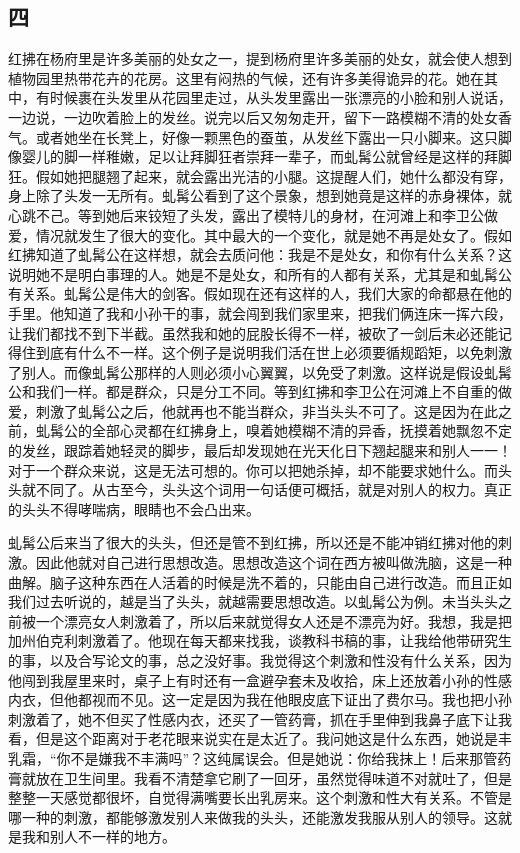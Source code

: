 \subsection{四} 

红拂在杨府里是许多美丽的处女之一，提到杨府里许多美丽的处女，就会使人想到植物园里热带花卉的花房。这里有闷热的气候，还有许多美得诡异的花。她在其中，有时候裹在头发里从花园里走过，从头发里露出一张漂亮的小脸和别人说话，一边说，一边吹着脸上的发丝。说完以后又匆匆走开，留下一路模糊不清的处女香气。或者她坐在长凳上，好像一颗黑色的蚕茧，从发丝下露出一只小脚来。这只脚像婴儿的脚一样稚嫩，足以让拜脚狂者崇拜一辈子，而虬髯公就曾经是这样的拜脚狂。假如她把腿翘了起来，就会露出光洁的小腿。这提醒人们，她什么都没有穿，身上除了头发一无所有。虬髯公看到了这个景象，想到她竟是这样的赤身裸体，就心跳不己。等到她后来铰短了头发，露出了模特儿的身材，在河滩上和李卫公做爱，情况就发生了很大的变化。其中最大的一个变化，就是她不再是处女了。假如红拂知道了虬髯公在这样想，就会去质问他：我是不是处女，和你有什么关系？这说明她不是明白事理的人。她是不是处女，和所有的人都有关系，尤其是和虬髯公有关系。虬髯公是伟大的剑客。假如现在还有这样的人，我们大家的命都悬在他的手里。他知道了我和小孙干的事，就会闯到我们家里来，把我们俩连床一挥六段，让我们都找不到下半截。虽然我和她的屁股长得不一样，被砍了一剑后未必还能记得住到底有什么不一样。这个例子是说明我们活在世上必须要循规蹈矩，以免刺激了别人。而像虬髯公那样的人则必须小心翼翼，以免受了刺激。这样说是假设虬髯公和我们一样。都是群众，只是分工不同。等到红拂和李卫公在河滩上不自重的做爱，刺激了虬髯公之后，他就再也不能当群众，非当头头不可了。这是因为在此之前，虬髯公的全部心灵都在红拂身上，嗅着她模糊不清的异香，抚摸着她飘忽不定的发丝，跟踪着她轻灵的脚步，最后却发现她在光天化日下翘起腿来和别人一一！对于一个群众来说，这是无法可想的。你可以把她杀掉，却不能要求她什么。而头头就不同了。从古至今，头头这个词用一句话便可概括，就是对别人的权力。真正的头头不得哮喘病，眼睛也不会凸出来。 

虬髯公后来当了很大的头头，但还是管不到红拂，所以还是不能冲销红拂对他的刺激。因此他就对自己进行思想改造。思想改造这个词在西方被叫做洗脑，这是一种曲解。脑子这种东西在人活着的时候是洗不着的，只能由自己进行改造。而且正如我们过去听说的，越是当了头头，就越需要思想改造。以虬髯公为例。未当头头之前被一个漂亮女人刺激着了，所以后来就觉得女人还是不漂亮为好。我想，我是把加州伯克利刺激着了。他现在每天都来找我，谈教科书稿的事，让我给他带研究生的事，以及合写论文的事，总之没好事。我觉得这个刺激和性没有什么关系，因为他闯到我屋里来时，桌子上有时还有一盒避孕套未及收拾，床上还放着小孙的性感内衣，但他都视而不见。这一定是因为我在他眼皮底下证出了费尔马。我也把小孙刺激着了，她不但买了性感内衣，还买了一管药膏，抓在手里伸到我鼻子底下让我看，但是这个距离对于老花眼来说实在是太近了。我问她这是什么东西，她说是丰乳霜，“你不是嫌我不丰满吗”？这纯属误会。但是她说：你给我抹上！后来那管药膏就放在卫生间里。我看不清楚拿它刷了一回牙，虽然觉得味道不对就吐了，但是整整一天感觉都很坏，自觉得满嘴要长出乳房来。这个刺激和性大有关系。不管是哪一种的刺激，都能够激发别人来做我的头头，还能激发我服从别人的领导。这就是我和别人不一样的地方。 

